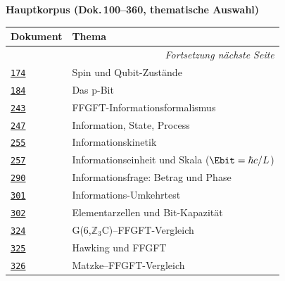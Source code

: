 \vspace{0.5em}
\noindent\textbf{Hauptkorpus (Dok.\,100–360, thematische Auswahl)}

\vspace{0.3em}
{\scriptsize
\setlength{\LTleft}{0pt}
\setlength{\LTright}{0pt}
\begin{longtable}{@{}p{}p{}@{}}
\toprule
\textbf{Dokument} & \textbf{Thema} \\
\midrule
\endhead
\midrule
\multicolumn{2}{r}{\scriptsize\itshape Fortsetzung nächste Seite} \\
\endfoot
\bottomrule
\endlastfoot
\href{https://github.com/jpascher/T0-Time-Mass-Duality/blob/main/2/pdf/174_T0_Spin_Qubit_Zustaende_De.pdf}{\texttt{174}} &
  Spin und Qubit-Zustände \\
\href{https://github.com/jpascher/T0-Time-Mass-Duality/blob/main/2/pdf/184_p-bit_De.pdf}{\texttt{184}} &
  Das p-Bit \\
\href{https://github.com/jpascher/T0-Time-Mass-Duality/blob/main/2/pdf/243_FFGFT_Informationsformalismus_De.pdf}{\texttt{243}} &
  FFGFT-Informationsformalismus \\
\href{https://github.com/jpascher/T0-Time-Mass-Duality/blob/main/2/pdf/247_Information_State_Process_De.pdf}{\texttt{247}} &
  Information, State, Process \\
\href{https://github.com/jpascher/T0-Time-Mass-Duality/blob/main/2/pdf/255_Information_Kinetik_De.pdf}{\texttt{255}} &
  Informationskinetik \\
\href{https://github.com/jpascher/T0-Time-Mass-Duality/blob/main/2/pdf/257_Informationseinheit_Skala_De.pdf}{\texttt{257}} &
  Informationseinheit und Skala ($\Ebit = \hbar c/L$) \\
\href{https://github.com/jpascher/T0-Time-Mass-Duality/blob/main/2/pdf/290_Informationsfrage_Betrag_Phase_De.pdf}{\texttt{290}} &
  Informationsfrage: Betrag und Phase \\
\href{https://github.com/jpascher/T0-Time-Mass-Duality/blob/main/2/pdf/301_Information_Umkehrtest_De.pdf}{\texttt{301}} &
  Informations-Umkehrtest \\
\href{https://github.com/jpascher/T0-Time-Mass-Duality/blob/main/2/pdf/302_Elementarzellen_Spektrale_Antwort_De.pdf}{\texttt{302}} &
  Elementarzellen und Bit-Kapazität \\
\href{https://github.com/jpascher/T0-Time-Mass-Duality/blob/main/2/pdf/324_G6_Z3C_FFGFT_Vergleich_De.pdf}{\texttt{324}} &
  G(6,$\mathbb{Z}_3$C)--FFGFT-Vergleich \\
\href{https://github.com/jpascher/T0-Time-Mass-Duality/blob/main/2/pdf/325_Hawking_FFGFT_De.pdf}{\texttt{325}} &
  Hawking und FFGFT \\
\href{https://github.com/jpascher/T0-Time-Mass-Duality/blob/main/2/pdf/326_Matzke_FFGFT_Vergleich_De.pdf}{\texttt{326}} &
  Matzke--FFGFT-Vergleich \\
\end{longtable}
}
